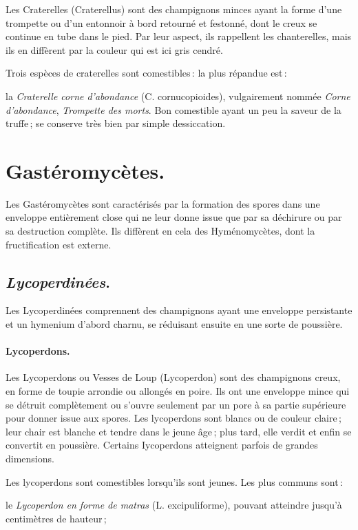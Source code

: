 Les Craterelles (Craterellus) sont des champignons minces ayant la forme d'une
trompette ou d'un entonnoir à bord retourné et festonné, dont le creux se
continue en tube dans le pied. Par leur aspect, ils rappellent les
chanterelles, mais ils en diffèrent par la couleur qui est ici gris cendré.

Trois espèces de craterelles sont comestibles : la plus répandue est :

la \textit{Craterelle corne d’abondance} (C. cornucopioides), vulgairement
nommée \textit{Corne d'abondance}, \textit{Trompette des morts}. Bon comestible
ayant un peu la saveur de la truffe ; se conserve très bien par simple
dessiccation.

\section*{\centering Gastéromycètes.}

Les Gastéromycètes sont caractérisés par la formation des spores dans une
enveloppe entièrement close qui ne leur donne issue que par sa déchirure ou par
sa destruction complète. Ils diffèrent en cela des Hyménomycètes, dont la
fructification est externe.

\subsection*{\centering \textit{Lycoperdinées}.}

Les Lycoperdinées comprennent des champignons ayant une enveloppe persistante
et un hymenium d'abord charnu, se réduisant ensuite en une sorte de poussière.

\paragraph{Lycoperdons.}

Les Lycoperdons ou Vesses de Loup (Lycoperdon) sont des champignons creux, en
forme de toupie arrondie ou allongés en poire. Ils ont une enveloppe mince qui
se détruit complètement ou s'ouvre seulement par un pore à sa partie supérieure
pour donner issue aux spores. Les lycoperdons sont blancs ou de couleur
claire ;  leur chair est blanche et tendre dans le jeune âge ; plus tard, elle
verdit et enfin se convertit en poussière. Certains Iycoperdons atteignent
parfois de grandes dimensions.

Les lycoperdons sont comestibles lorsqu'ils sont jeunes. Les plus communs
sont :

le \textit{Lycoperdon en forme de matras} (L. excipuliforme), pouvant atteindre
jusqu'à {\mmm} centimètres de hauteur ;

